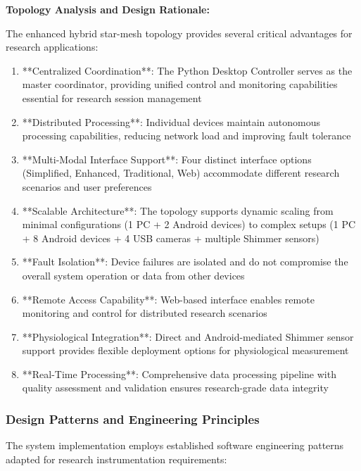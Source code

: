 \documentclass[12pt,a4paper]{article}
\begin{document}
\textbf{Topology Analysis and Design Rationale:}

The enhanced hybrid star-mesh topology provides several critical advantages for research applications:

\begin{enumerate}
\item **Centralized Coordination**: The Python Desktop Controller serves as the master coordinator, providing unified
   control and monitoring capabilities essential for research session management

\item **Distributed Processing**: Individual devices maintain autonomous processing capabilities, reducing network load and
   improving fault tolerance

\item **Multi-Modal Interface Support**: Four distinct interface options (Simplified, Enhanced, Traditional, Web)
   accommodate different research scenarios and user preferences

\item **Scalable Architecture**: The topology supports dynamic scaling from minimal configurations (1 PC + 2 Android
   devices) to complex setups (1 PC + 8 Android devices + 4 USB cameras + multiple Shimmer sensors)

\item **Fault Isolation**: Device failures are isolated and do not compromise the overall system operation or data from
   other devices

\item **Remote Access Capability**: Web-based interface enables remote monitoring and control for distributed research
   scenarios

\item **Physiological Integration**: Direct and Android-mediated Shimmer sensor support provides flexible deployment
   options for physiological measurement

\item **Real-Time Processing**: Comprehensive data processing pipeline with quality assessment and validation ensures
   research-grade data integrity

\end{enumerate}
\subsubsection{Design Patterns and Engineering Principles}

The system implementation employs established software engineering patterns adapted for research instrumentation
requirements:
\end{document}
